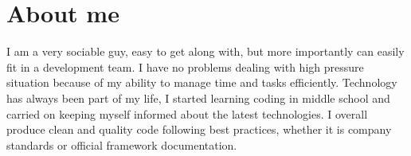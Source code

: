 \section*{About me}
I am a very sociable guy, easy to get along with, but more importantly can easily fit in a development team.
I have no problems dealing with high pressure situation because of my ability to manage time and tasks efficiently.
Technology has always been part of my life, I started learning coding in middle school and carried on keeping myself informed about the latest technologies.
I overall produce clean and quality code following best practices, whether it is company standards or official framework documentation.
